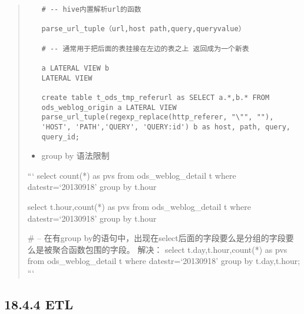 \begin{quote}
\begin{itemize}
\begin{verbatim}
# -- hive内置解析url的函数

parse_url_tuple（url,host path,query,queryvalue）

# -- 通常用于把后面的表挂接在左边的表之上 返回成为一个新表

a LATERAL VIEW b 
LATERAL VIEW

create table t_ods_tmp_referurl as SELECT a.*,b.* FROM ods_weblog_origin a LATERAL VIEW parse_url_tuple(regexp_replace(http_referer, "\"", ""), 'HOST', 'PATH','QUERY', 'QUERY:id') b as host, path, query, query_id; 
\end{verbatim}
\item
  group by 语法限制
\end{itemize}

``` select count(*) as pvs from ods\_weblog\_detail t where
datestr=`20130918' group by t.hour

select t.hour,count(*) as pvs from ods\_weblog\_detail t where
datestr=`20130918' group by t.hour

\# -- 在有group
by的语句中，出现在select后面的字段要么是分组的字段要么是被聚合函数包围的字段。
解决： select t.day,t.hour,count(*) as pvs from ods\_weblog\_detail t
where datestr=`20130918' group by t.day,t.hour; ```
\end{quote}

\subsection{18.4.4 ETL}\label{etl}

